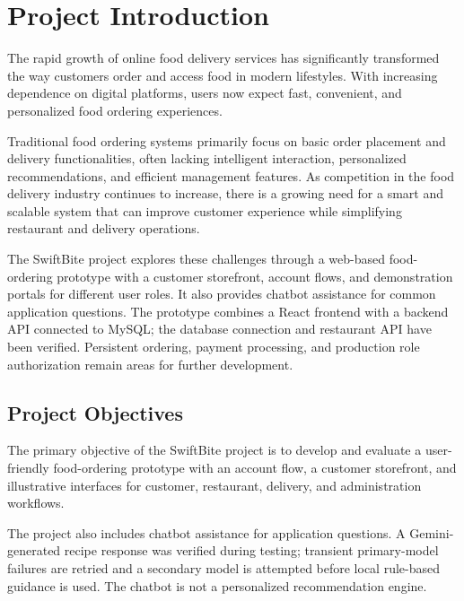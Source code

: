 \chapter{Project Introduction}

The rapid growth of online food delivery services has significantly transformed the way customers order and access food in modern lifestyles. With increasing dependence on digital platforms, users now expect fast, convenient, and personalized food ordering experiences.

\vspace{0.5mm}

Traditional food ordering systems primarily focus on basic order placement and delivery functionalities, often lacking intelligent interaction, personalized recommendations, and efficient management features. As competition in the food delivery industry continues to increase, there is a growing need for a smart and scalable system that can improve customer experience while simplifying restaurant and delivery operations.

\vspace{0.5mm}

The SwiftBite project explores these challenges through a web-based food-ordering prototype with a customer storefront, account flows, and demonstration portals for different user roles. It also provides chatbot assistance for common application questions. The prototype combines a React frontend with a backend API connected to MySQL; the database connection and restaurant API have been verified. Persistent ordering, payment processing, and production role authorization remain areas for further development.

\section{Project Objectives}

The primary objective of the SwiftBite project is to develop and evaluate a user-friendly food-ordering prototype with an account flow, a customer storefront, and illustrative interfaces for customer, restaurant, delivery, and administration workflows.

The project also includes chatbot assistance for application questions. A Gemini-generated recipe response was verified during testing; transient primary-model failures are retried and a secondary model is attempted before local rule-based guidance is used. The chatbot is not a personalized recommendation engine.

